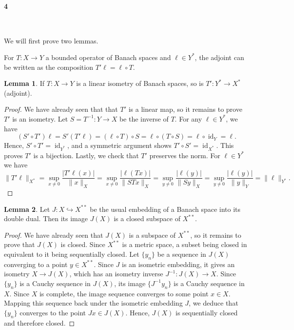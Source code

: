 \documentclass[12pt]{article}
\theoremstyle{definition}
\newtheorem{lemma}{Lemma}
\newcommand{\<}{\langle}
\renewcommand{\>}{\rangle}
\DeclareMathOperator{\id}{id}
\newcommand{\inc}{\hookrightarrow}
\begin{document}
\newpage
\paragraph{4} \

We will first prove two lemmas.

For $T : X \to Y$ a bounded operator of Banach spaces and $\ell \in Y^*$, the adjoint can be written as the composition $T'\ell = \ell \circ T$. 

\begin{lemma}
    If $T : X \to Y$ is a linear isometry of Banach spaces, so is $T' : Y^* \to X^*$ (adjoint).
\end{lemma}

\begin{proof}
    We have already seen that that $T'$ is a linear map, so it remains to prove $T'$ is an isometry.
    Let $S = T^{-1} : Y \to X$ be the inverse of $T$.
    For any $\ell \in Y^*$, we have
    \[
        (S' \circ T')\ell
            = S'(T'\ell)
            = (\ell \circ T) \circ S
            = \ell \circ (T \circ S)
            = \ell \circ \id_Y
            = \ell.
    \]
    Hence, $S' \circ T' = \id_{Y^*}$, and a symmetric argument shows $T' \circ S' = \id_{X^*}$.
    This proves $T'$ is a bijection.
    Lastly, we check that $T'$ preserves the norm. 
    For $\ell \in Y^*$ we have
    \[
        \|T'\ell\|_{X^*}
            = \sup_{x \ne 0} \frac{|T'\ell(x)|}{\|x\|_X}
            = \sup_{x \ne 0} \frac{|\ell(Tx)|}{\|STx\|_X}
            = \sup_{y \ne 0} \frac{|\ell(y)|}{\|Sy\|_X}
            = \sup_{y \ne 0} \frac{|\ell(y)|}{\|y\|_Y}
            = \|\ell\|_{Y^*}.
    \]
\end{proof}

\begin{lemma}
    Let $J : X \inc X^{**}$ be the usual embedding of a Banach space into its double dual.
    Then its image $J(X)$ is a closed subspace of $X^{**}$.
\end{lemma}

\begin{proof}
    We have already seen that $J(X)$ is a subspace of $X^{**}$, so it remains to prove that $J(X)$ is closed.
    Since $X^{**}$ is a metric space, a subset being closed in equivalent to it being sequentially closed.
    Let $\{y_n\}$ be a sequence in $J(X)$ converging to a point $y \in X^{**}$.
    Since $J$ is an isometric embedding, it gives an isometry $X \to J(X)$, which has an isometry inverse $J^{-1} : J(X) \to X$.
    Since $\{y_n\}$ is a Cauchy sequence in $J(X)$, its image $\{J^{-1}y_n\}$ is a Cauchy sequence in $X$.
    Since $X$ is complete, the image sequence converges to some point $x \in X$.
    Mapping this sequence back under the isometric embedding $J$, we deduce that $\{y_n\}$ converges to the point $Jx \in J(X)$.
    Hence, $J(X)$ is sequentially closed and therefore closed.
\end{proof}
\end{document}
